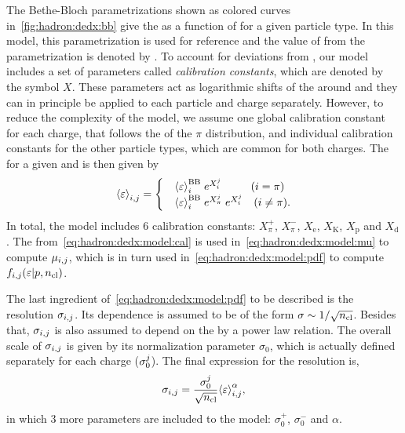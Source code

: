 The Bethe-Bloch parametrizations shown as colored curves
in~\cref{fig:hadron:dedx:bb} give the \meaneps as a
function of \pp for a given particle type.
In this model, this parametrization is used for reference
and the value of \meaneps from the parametrization
is denoted by \meanepsbb.
To account for deviations from \meanepsbb,
our model includes a set of parameters called
\textit{calibration constants}, which are denoted by the symbol $X$.
These parameters act as logarithmic shifts of the \meaneps
around \meanepsbb and they can in principle be applied
to each particle and charge separately. However, to reduce the complexity
of the model, we assume one global calibration constant
for each charge, that follows the \meaneps of the $\pi$ distribution,
and individual calibration constants for the other particle types,
which are common for both charges. The \meaneps for a
given \ipart and \ich is then given by
\begin{equation}
  \meaneps_{\ipart,\ich} =
  \begin{cases}
    & \meaneps_{\ipart}^\text{BB} \; e^{X_{\ipart}^{\ich}} \ \ \ \ \ \ \ \ (i=\pi) \\
    & \meaneps_{\ipart}^\text{BB} \; e^{X_{\pi}^{\ich}} \; e^{X_{\ipart}^{\ich}} \ \ \ (i\neq\pi).
  \end{cases}
  \label{eq:hadron:dedx:model:cal}
\end{equation}
In total, the model includes 6 calibration constants:
$X_{\pi}^{+}$, $X_{\pi}^{-}$, $X_\text{e}$, $X_\text{K}$, $X_\text{p}$ and $X_\text{d}$.
The \meaneps from~\cref{eq:hadron:dedx:model:cal} is used
in~\cref{eq:hadron:dedx:model:mu} to compute $\mu_{i,j}$,
which is in turn used in~\cref{eq:hadron:dedx:model:pdf}
to compute $f_{i,j}(\mbox{$\varepsilon$}|p,\mbox{$n_{\text{cl}}$})$.

The last ingredient of~\cref{eq:hadron:dedx:model:pdf}
to be described is the resolution $\sigma_{i,j}$. 
Its \ncl dependence is assumed to be of the form
$\sigma \sim 1/\sqrt{\mbox{$n_{\text{cl}}$}}$. Besides that, $\sigma_{i,j}$
is also assumed to depend on the \meaneps by a power law relation.
The overall scale of $\sigma_{i,j}$ is given by its normalization
parameter $\sigma_0$, which is actually defined separately for each charge ($\sigma_0^{j}$).
The final expression for the resolution is,
\begin{equation}
  \sigma_{i,j} = \frac{\sigma_0^{j}}{\sqrt{\mbox{$n_{\text{cl}}$}}} \mbox{$\langle\varepsilon\rangle$}_{i,j}^{\alpha},
  \label{eq:hadron:dedx:model:sigma}
\end{equation}
in which 3 more parameters are included to the model: $\sigma_0^+$, $\sigma_0^-$ and $\alpha$. 

